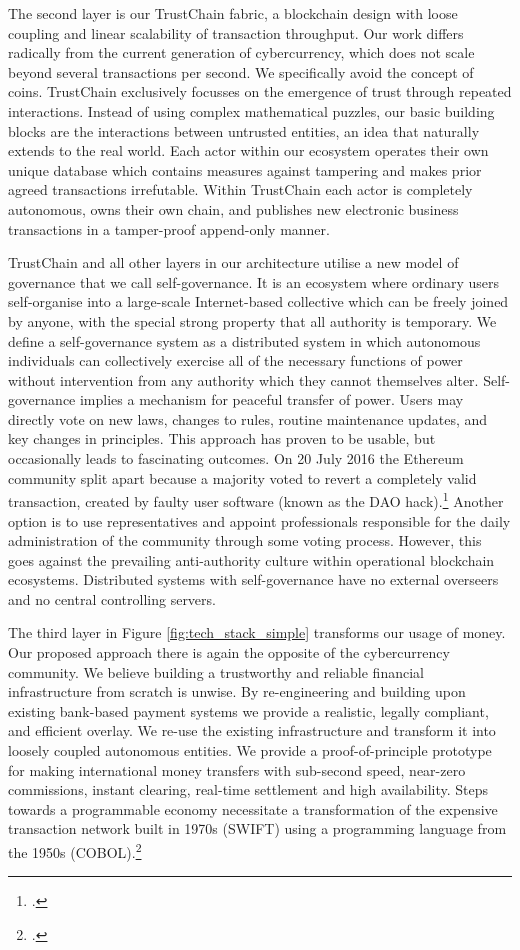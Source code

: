 \documentclass[USenglish]{article}
\begin{document}
The second layer is our TrustChain fabric, a blockchain design with loose coupling and linear scalability of transaction throughput. 
Our work differs radically from the current generation of cybercurrency, which does not scale beyond several transactions per second. 
We specifically avoid the concept of coins.
TrustChain exclusively focusses on the emergence of trust through repeated interactions.
Instead of using complex mathematical puzzles, our basic building blocks are the interactions between untrusted entities, an idea that naturally extends to the real world.
Each actor within our ecosystem operates their own unique database which contains measures against tampering and makes prior agreed transactions irrefutable.
Within TrustChain each actor is completely autonomous, owns their own chain, and publishes new electronic business transactions in a tamper-proof append-only manner.

TrustChain and all other layers in our architecture utilise a new model of governance that we call self-governance.
It is an ecosystem where ordinary users self-organise into a large-scale Internet-based collective which can be freely joined by anyone, with the special strong property that all authority is temporary.
We define a self-governance system as a distributed system in which autonomous individuals can collectively exercise all of the necessary functions of power without intervention from any authority which they cannot themselves alter.
Self-governance implies a mechanism for peaceful transfer of power. 
Users may directly vote on new laws, changes to rules, routine maintenance updates, and key changes in principles. 
This approach has proven to be usable, but occasionally leads to fascinating outcomes.
On 20 July 2016 the Ethereum community split apart because a majority voted to revert a completely valid transaction, created by faulty user software (known as the DAO hack).\footcite{cryptocomparedao}
Another option is to use representatives and appoint professionals responsible for the daily administration of the community through some voting process.
However, this goes against the prevailing anti-authority culture within operational blockchain ecosystems.
Distributed systems with self-governance have no external overseers and no central controlling servers.

The third layer in Figure \ref{fig:tech_stack_simple} transforms our usage of money.
Our proposed approach there is again the opposite of the cybercurrency community.
We believe building a trustworthy and reliable financial infrastructure from scratch is unwise.
By re-engineering and building upon existing bank-based payment systems we provide a realistic, legally compliant, and efficient overlay.
We re-use the existing infrastructure and transform it into loosely coupled autonomous entities.
We provide a proof-of-principle prototype for making international money transfers with sub-second speed, near-zero commissions, instant clearing, real-time settlement and high availability. 
Steps towards a programmable economy necessitate a transformation of the expensive transaction network built in 1970s (SWIFT) using a programming language from the 1950s (COBOL).\footcite{scott2017society}
\end{document}
